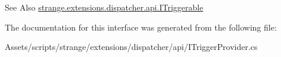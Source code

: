 \begin{DoxySeeAlso}{See Also}
\hyperlink{interfacestrange_1_1extensions_1_1dispatcher_1_1api_1_1_i_triggerable}{strange.\-extensions.\-dispatcher.\-api.\-I\-Triggerable} 
\end{DoxySeeAlso}


The documentation for this interface was generated from the following file\-:\begin{DoxyCompactItemize}
\item 
Assets/scripts/strange/extensions/dispatcher/api/I\-Trigger\-Provider.\-cs\end{DoxyCompactItemize}
